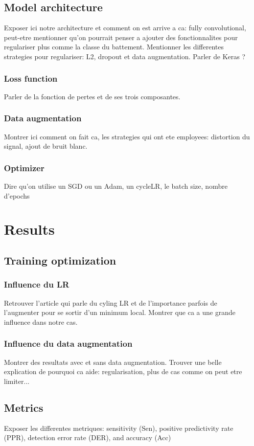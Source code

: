 \documentclass{article}
\begin{document}
\subsection{Model architecture}
Exposer ici notre architecture et comment on est arrive a ca: fully convolutional, peut-etre mentionner qu'on pourrait penser a ajouter des fonctionnalites pour regulariser plus comme la classe du battement.
Mentionner les differentes strategies pour regulariser: L2, dropout et data augmentation. Parler de Keras ?
\subsubsection{Loss function}
Parler de la fonction de pertes et de ses trois composantes.
\subsubsection{Data augmentation}
Montrer ici comment on fait ca, les strategies qui ont ete employees: distortion du signal, ajout de bruit blanc.
\subsubsection{Optimizer}
Dire qu'on utilise un SGD ou un Adam, un cycleLR, le batch size, nombre d'epochs

\section{Results}
\subsection{Training optimization}
\subsubsection{Influence du LR}
Retrouver l'article qui parle du cyling LR et de l'importance parfois de l'augmenter pour se sortir d'un minimum local. Montrer que ca a une grande influence dans notre cas.
\subsubsection{Influence du data augmentation}
Montrer des resultats avec et sans data augmentation. Trouver une belle explication de pourquoi ca aide: regularisation, plus de cas comme on peut etre limiter...
\subsection{Metrics}
Exposer les differentes metriques:
sensitivity (Sen), positive predictivity rate (PPR), detection error rate (DER), and accuracy (Acc)
\end{document}
